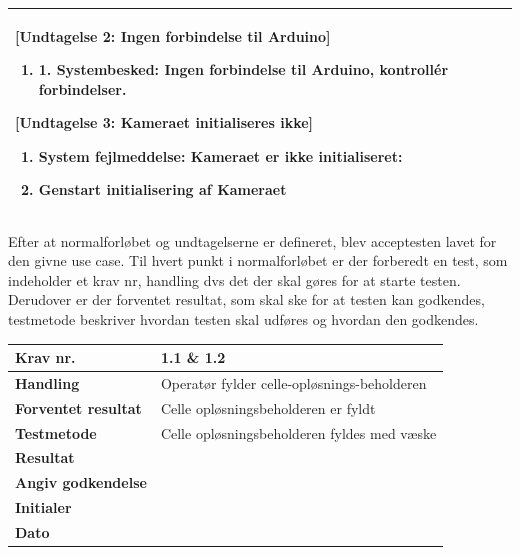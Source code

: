 \begin{center}
\begin{longtable}{ | m{4cm} | m{8cm}| }
			[Undtagelse 2: Ingen forbindelse til Arduino]
			
			\begin{enumerate}
			\item 1.	Systembesked: Ingen forbindelse til Arduino, kontrollér forbindelser.
			\end{enumerate} 
	
			[Undtagelse 3: Kameraet initialiseres ikke]
			
			\begin{enumerate}
			\item System fejlmeddelse: Kameraet er ikke initialiseret:
			\item Genstart initialisering af Kameraet
			\end{enumerate} \\
			\hline
		\end{longtable}
	\end{center}

Efter at normalforløbet og undtagelserne er defineret, blev acceptesten lavet for den givne use case. Til hvert punkt i normalforløbet er der forberedt en test, som indeholder et krav nr, handling dvs det der skal gøres for at starte testen. Derudover er der forventet resultat, som skal ske for at testen kan godkendes, testmetode beskriver hvordan testen skal udføres og hvordan den godkendes.

\begin{center}
		\begin{longtable}{ | m{4cm}| m{8.5cm}|} 
			\hline
			\textbf{Krav nr.} & 1.1 \& 1.2    \\ 
			\hline
			\textbf{Handling} &  Operatør fylder celle-opløsnings-beholderen   \\
			\hline
			\textbf{Forventet resultat} &  Celle opløsningsbeholderen er fyldt  \\
			\hline
			\textbf{Testmetode}  &  Celle opløsningsbeholderen fyldes med væske  \\
			\hline
			\textbf{Resultat}  &    \\
			\hline
			\textbf{Angiv godkendelse} &     \\
			\hline
			\textbf{Initialer} &     \\
			\hline
			\textbf{Dato} &    \\
			\hline
		\end{longtable}
	\end{center}
	
